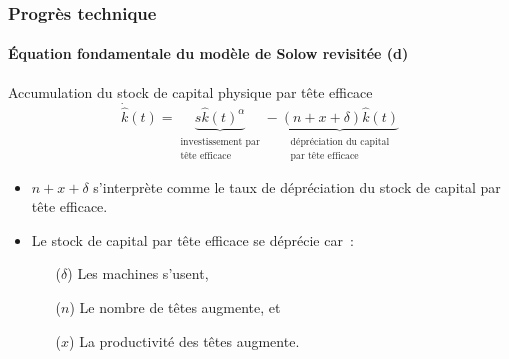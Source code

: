 \documentclass[10pt,notheorems]{beamer}
\theoremstyle{plain}
\theoremstyle{definition} %
\begin{document}
\begin{frame}
  \frametitle{Progrès technique}
  \framesubtitle{Équation fondamentale du modèle de Solow revisitée (d)}

  \bigskip

  \begin{block}{Accumulation du stock de capital physique par tête efficace}
    \[
      \dot{\hat{k}}(t) =  \underbrace{s \hat k(t)^{\alpha}}_{\substack{\text{investissement par}\\\text{tête efficace}}} -  \underbrace{(n+x+\delta) \hat k(t)}_{\substack{\text{dépréciation du capital}\\\text{par tête efficace}}}
    \]
  \end{block}

  \bigskip

  \begin{itemize}

  \item $n+x+\delta$ s'interprète comme le taux de dépréciation du stock de capital par tête efficace.\newline

  \item Le stock de capital par tête efficace se déprécie car~:\newline
    \begin{itemize}
    \item[($\delta$)] Les machines s'usent,
    \item[($n$)] Le nombre de têtes augmente, et
    \item[($x$)] La productivité des têtes augmente.
    \end{itemize}

  \end{itemize}

\end{frame}
\end{document}
